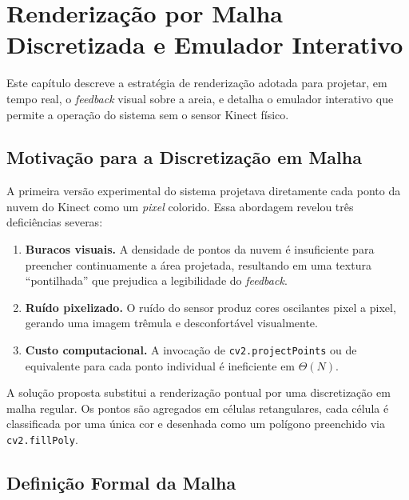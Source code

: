 
\chapter{Renderização por Malha Discretizada e Emulador Interativo}
\label{cap:rendering}

Este capítulo descreve a estratégia de renderização adotada para
projetar, em tempo real, o \emph{feedback} visual sobre a areia, e
detalha o emulador interativo que permite a operação do sistema sem o
sensor Kinect físico.

\section{Motivação para a Discretização em Malha}
\label{sec:motiv-malha}

A primeira versão experimental do sistema projetava diretamente
cada ponto da nuvem do Kinect como um \emph{pixel} colorido. Essa
abordagem revelou três deficiências severas:

\begin{enumerate}
    \item \textbf{Buracos visuais.} A densidade de pontos da nuvem é
          insuficiente para preencher continuamente a área projetada,
          resultando em uma textura ``pontilhada'' que prejudica a
          legibilidade do \textit{feedback}.
    \item \textbf{Ruído pixelizado.} O ruído do sensor produz cores
          oscilantes pixel a pixel, gerando uma imagem trêmula e
          desconfortável visualmente.
    \item \textbf{Custo computacional.} A invocação de
          \texttt{cv2.projectPoints} ou de equivalente para cada ponto
          individual é ineficiente em $\Theta(N)$.
\end{enumerate}

A solução proposta substitui a renderização pontual por uma
discretização em malha regular. Os pontos são agregados em
células retangulares, cada célula é classificada por uma única cor e
desenhada como um polígono preenchido via
\texttt{cv2.fillPoly}.

\section{Definição Formal da Malha}
\label{sec:malha}

